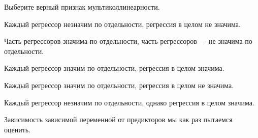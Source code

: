 
\begin{question}
Выберите верный признак мультиколлинеарности.
\begin{answerlist}
  \item Каждый регрессор незначим по отдельности, регрессия в целом не значима.
  \item Часть регрессоров значима по отдельности, часть регрессоров --- не значима по отдельности.
  \item Каждый регрессор значим по отдельности, регрессия в целом значима.
  \item Каждый регрессор значим по отдельности, регрессия в целом не значима.
  \item Каждый регрессор незначим по отдельности, однако регрессия в целом значима.
\end{answerlist}
\end{question}

\begin{solution}
Зависимость зависимой переменной от предикторов мы как раз пытаемся оценить.
\end{solution}

